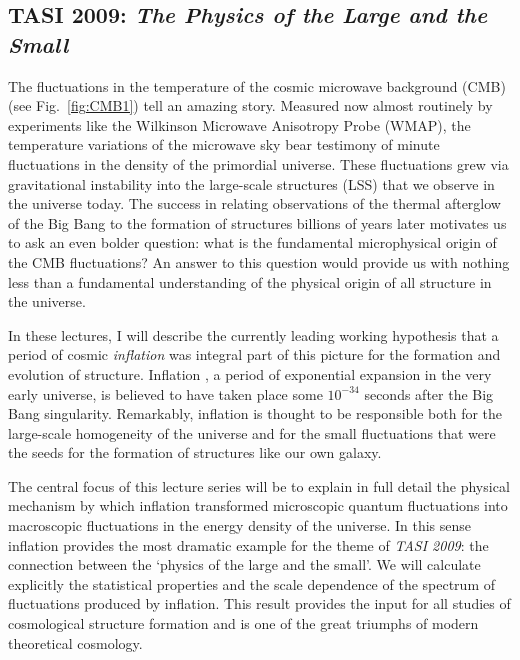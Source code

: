 \documentclass[12pt,letterpaper,rotate]{article}
\begin{document}
{\subsection{TASI 2009: {\sl The Physics of the Large and the Small}}


The fluctuations in the temperature of the cosmic microwave background (CMB) (see Fig.~\ref{fig:CMB1}) tell an amazing story. Measured now almost routinely by experiments like the Wilkinson Microwave Anisotropy Probe (WMAP), the temperature variations of the microwave sky bear testimony of minute fluctuations in the density of the primordial universe.
These fluctuations grew via gravitational instability into the large-scale structures (LSS) that we observe in the universe today. %
The success in relating observations of the thermal afterglow of the Big Bang to the formation of structures billions of years later motivates us to ask an even bolder question: what is the fundamental microphysical origin of the CMB fluctuations?
An answer to this question would provide us with nothing less than a fundamental understanding of the physical origin of all structure in the universe.

In these lectures, I will describe the currently leading working hypothesis that a period of cosmic {\it inflation} was integral part of this picture for the formation and evolution of structure. 
Inflation \cite{Guth:1980zm, Linde:1981mu, Albrecht:1982wi}, a period of exponential expansion in the very early universe, is believed to have taken place some $10^{-34}$ seconds after the Big Bang singularity. 
Remarkably, inflation is thought to be responsible both for the large-scale homogeneity of the universe and for the small fluctuations that were the seeds for the formation of structures like our own galaxy.

The central focus of this lecture series will be to explain in full detail the physical mechanism by which inflation transformed microscopic quantum fluctuations into macroscopic fluctuations in the energy density of the universe.
In this sense inflation provides the most dramatic example for the theme of {\sl TASI 2009}: the connection between the `physics of the large and the small'.
We will calculate explicitly the statistical properties and the scale dependence of the spectrum of fluctuations produced by inflation. This result provides the input for all studies of cosmological structure formation and is one of the great triumphs of modern theoretical cosmology.



}
\end{document}
